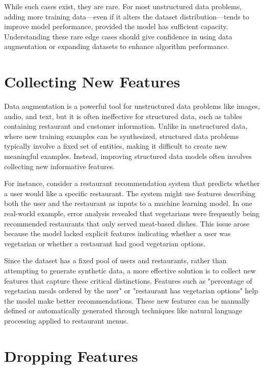 \documentclass[12pt,openany]{book}
\begin{document}
While such cases exist, they are rare. For most unstructured data problems, adding more training data—even if it alters the dataset distribution—tends to improve model performance, provided the model has sufficient capacity. Understanding these rare edge cases should give confidence in using data augmentation or expanding datasets to enhance algorithm performance.


\section{Collecting New Features}

Data augmentation is a powerful tool for unstructured data problems like images, audio, and text, but it is often ineffective for structured data, such as tables containing restaurant and customer information. Unlike in unstructured data, where new training examples can be synthesized, structured data problems typically involve a fixed set of entities, making it difficult to create new meaningful examples. Instead, improving structured data models often involves collecting new informative features. \newline

\begin{examplebox}
For instance, consider a restaurant recommendation system that predicts whether a user would like a specific restaurant. The system might use features describing both the user and the restaurant as inputs to a machine learning model. In one real-world example, error analysis revealed that vegetarians were frequently being recommended restaurants that only served meat-based dishes. This issue arose because the model lacked explicit features indicating whether a user was vegetarian or whether a restaurant had good vegetarian options.
\end{examplebox} 

Since the dataset has a fixed pool of users and restaurants, rather than attempting to generate synthetic data, a more effective solution is to collect new features that capture these critical distinctions. Features such as "percentage of vegetarian meals ordered by the user" or "restaurant has vegetarian options" help the model make better recommendations. These new features can be manually defined or automatically generated through techniques like natural language processing applied to restaurant menus. 



\section{Dropping Features}
\end{document}
